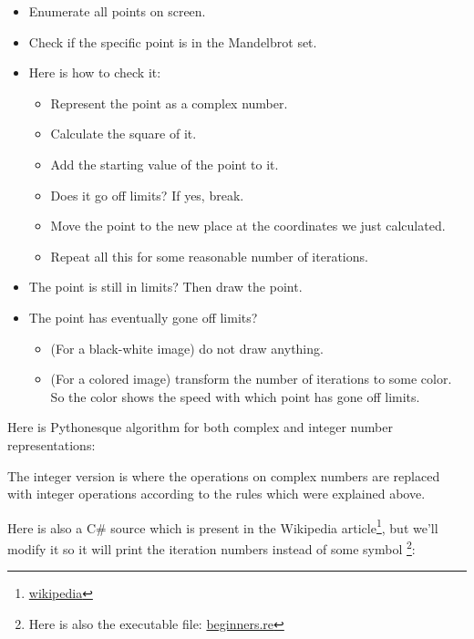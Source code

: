 \begin{itemize}
\item Enumerate all points on screen. 
\item Check if the specific point 
is in the Mandelbrot set.
\item Here is how to check it:

  \begin{itemize}
  \item Represent the point as a complex number.
  \item Calculate the square of it.
  \item Add the starting value of the point to it.
  \item Does it go off limits? If yes, break.
  \item Move the point to the 
new place at the coordinates we just calculated.
  \item Repeat all this for some reasonable 
number of iterations.
  \end{itemize}

\item The point is still in limits?
Then draw the point.

\item The point has eventually gone off limits?

  \begin{itemize}
    \item (For a black-white image) do not draw anything.
    \item 

(For a colored image) transform the number of iterations to some color. 
      So the color shows the speed with which point has gone off limits.
  \end{itemize}

\end{itemize}

%
Here is Pythonesque algorithm for both complex and integer number representations:




The integer version is where the operations on complex numbers are replaced with integer operations according to the rules
which were explained above.



Here is also a C\# source 
which is present in the Wikipedia article\footnote{\href{http://go.yurichev.com/17307}{wikipedia}}, but we'll modify it
so it will print the iteration numbers instead of some symbol
\footnote{Here is also the executable file: 
\href{http://go.yurichev.com/17163}{beginners.re}}:

